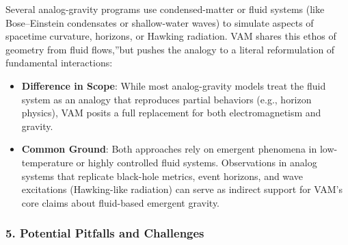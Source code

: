 Several analog-gravity programs use condensed-matter or fluid systems (like Bose–Einstein condensates or shallow-water waves) to simulate aspects of spacetime curvature, horizons, or Hawking radiation. VAM shares this ethos of \grqq geometry from fluid flows,\textquotedblright but pushes the analogy to a literal reformulation of fundamental interactions:

\begin{itemize}
    \item \textbf{Difference in Scope}: While most analog-gravity models treat the fluid system as an analogy that reproduces partial behaviors (e.g., horizon physics), VAM posits a full replacement for both electromagnetism and gravity.
    \item \textbf{Common Ground}: Both approaches rely on emergent phenomena in low-temperature or highly controlled fluid systems. Observations in analog systems that replicate black-hole metrics, event horizons, and wave excitations (Hawking-like radiation) can serve as indirect support for VAM's core claims about fluid-based emergent gravity.
\end{itemize}

\subsubsection*{5. Potential Pitfalls and Challenges}

